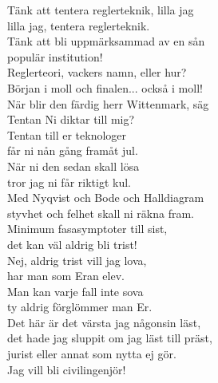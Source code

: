 \documentclass[a6paper,10pt]{article}
\begin{document}
\setlength{\oddsidemargin}{-0.37in}
\noindent
\begin{center}
\end{center}
\begin{lyrics}
Tänk att tentera reglerteknik, lilla jag \\
lilla jag, tentera reglerteknik. \\
Tänk att bli uppmärksammad av en sån \\
populär institution!
\vspace{5pt} \\
Reglerteori, vackers namn, eller hur? \\
Början i moll och finalen... också i moll! \\
När blir den färdig herr Wittenmark, säg \\
Tentan Ni diktar till mig?
\vspace{5pt} \\
Tentan till er teknologer \\
får ni nån gång framåt jul. \\
När ni den sedan skall lösa\\
tror jag ni får riktigt kul. \\
Med Nyqvist och Bode och Halldiagram \\
styvhet och felhet skall ni räkna fram.\\
Minimum fasasymptoter till sist, \\
det kan väl aldrig bli trist!
\vspace{5pt} \\
Nej, aldrig trist vill jag lova, \\
har man som Eran elev. \\
Man kan varje fall inte sova \\
ty aldrig förglömmer man Er. \\
Det här är det värsta jag någonsin läst, \\
det hade jag sluppit om jag läst till präst, \\
jurist eller annat som nytta ej gör. \\
Jag vill bli civilingenjör!
\end{lyrics}
\end{document}
